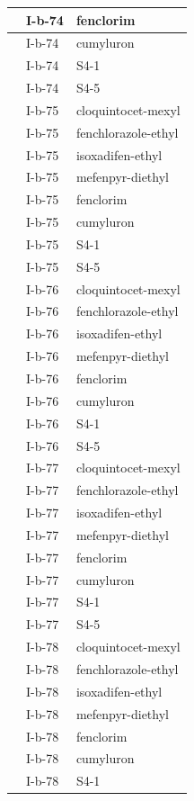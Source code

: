 \documentclass[11pt,a4paper]{article}
\begin{document}
\begin{table}[h]
\begin{tabular}{|l|l|l|}
 & I-b-74 & fenclorim \\ \hline
 & I-b-74 & cumyluron \\ \hline
 & I-b-74 & S4-1 \\ \hline
 & I-b-74 & S4-5 \\ \hline
 & I-b-75 & cloquintocet-mexyl \\ \hline
 & I-b-75 & fenchlorazole-ethyl \\ \hline
 & I-b-75 & isoxadifen-ethyl \\ \hline
 & I-b-75 & mefenpyr-diethyl \\ \hline
 & I-b-75 & fenclorim \\ \hline
 & I-b-75 & cumyluron \\ \hline
 & I-b-75 & S4-1 \\ \hline
 & I-b-75 & S4-5 \\ \hline
 & I-b-76 & cloquintocet-mexyl \\ \hline
 & I-b-76 & fenchlorazole-ethyl \\ \hline
 & I-b-76 & isoxadifen-ethyl \\ \hline
 & I-b-76 & mefenpyr-diethyl \\ \hline
 & I-b-76 & fenclorim \\ \hline
 & I-b-76 & cumyluron \\ \hline
 & I-b-76 & S4-1 \\ \hline
 & I-b-76 & S4-5 \\ \hline
 & I-b-77 & cloquintocet-mexyl \\ \hline
 & I-b-77 & fenchlorazole-ethyl \\ \hline
 & I-b-77 & isoxadifen-ethyl \\ \hline
 & I-b-77 & mefenpyr-diethyl \\ \hline
 & I-b-77 & fenclorim \\ \hline
 & I-b-77 & cumyluron \\ \hline
 & I-b-77 & S4-1 \\ \hline
 & I-b-77 & S4-5 \\ \hline
 & I-b-78 & cloquintocet-mexyl \\ \hline
 & I-b-78 & fenchlorazole-ethyl \\ \hline
 & I-b-78 & isoxadifen-ethyl \\ \hline
 & I-b-78 & mefenpyr-diethyl \\ \hline
 & I-b-78 & fenclorim \\ \hline
 & I-b-78 & cumyluron \\ \hline
 & I-b-78 & S4-1 \\ \hline

\end{tabular}
\end{table}
\end{document}
